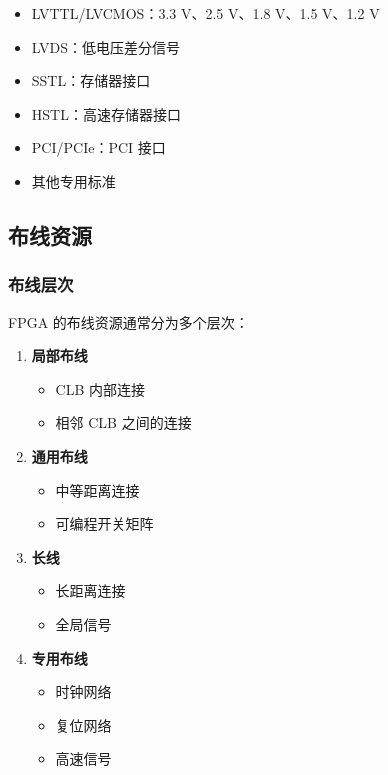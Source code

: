 \begin{itemize}
  \item LVTTL/LVCMOS：3.3 V、2.5 V、1.8 V、1.5 V、1.2 V
  \item LVDS：低电压差分信号
  \item SSTL：存储器接口
  \item HSTL：高速存储器接口
  \item PCI/PCIe：PCI 接口
  \item 其他专用标准
\end{itemize}

\subsection{布线资源}

\subsubsection{布线层次}

FPGA 的布线资源通常分为多个层次：

\begin{enumerate}
  \item \textbf{局部布线}
    \begin{itemize}
      \item CLB 内部连接
      \item 相邻 CLB 之间的连接
    \end{itemize}

  \item \textbf{通用布线}
    \begin{itemize}
      \item 中等距离连接
      \item 可编程开关矩阵
    \end{itemize}

  \item \textbf{长线}
    \begin{itemize}
      \item 长距离连接
      \item 全局信号
    \end{itemize}

  \item \textbf{专用布线}
    \begin{itemize}
      \item 时钟网络
      \item 复位网络
      \item 高速信号
    \end{itemize}
\end{enumerate}

